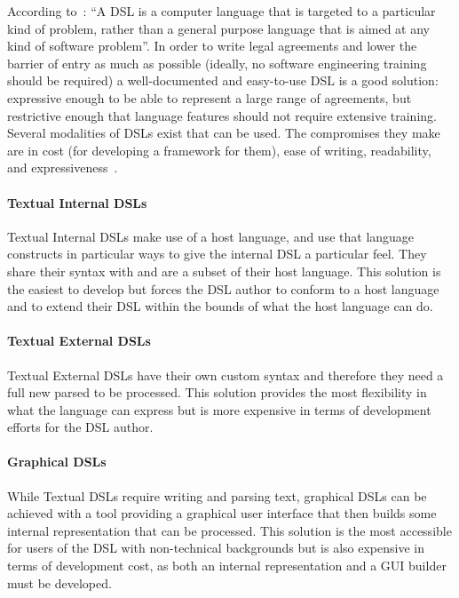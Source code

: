 According to~\cite{fowlerDsl}: ``A DSL is a computer language that is targeted to a particular kind of problem, rather than a general purpose language that is aimed at any kind of software problem''.
In order to write legal agreements and lower the barrier of entry as much as possible (ideally, no software engineering training should be required) a well-documented and easy-to-use DSL is a good solution: expressive enough to be able to represent a large range of agreements, but restrictive enough that language features should not require extensive training.\\

Several modalities of DSLs exist that can be used.
The compromises they make are in cost (for developing a framework for them), ease of writing, readability, and expressiveness~\cite{fowlerDslGuide, fowlerLangWorkbench}.

\paragraph{Textual Internal DSLs}

Textual Internal DSLs make use of a host language, and use that language constructs in particular ways to give the internal DSL a particular feel.
They share their syntax with and are a subset of their host language.
This solution is the easiest to develop but forces the DSL author to conform to a host language and to extend their DSL within the bounds of what the host language can do.

\paragraph{Textual External DSLs}

Textual External DSLs have their own custom syntax and therefore they need a full new parsed to be processed.
This solution provides the most flexibility in what the language can express but is more expensive in terms of development efforts for the DSL author.

\paragraph{Graphical DSLs}

While Textual DSLs require writing and parsing text, graphical DSLs can be achieved with a tool providing a graphical user interface that then builds some internal representation that can be processed.
This solution is the most accessible for users of the DSL with non-technical backgrounds but is also expensive in terms of development cost, as both an internal representation and a GUI builder must be developed.

